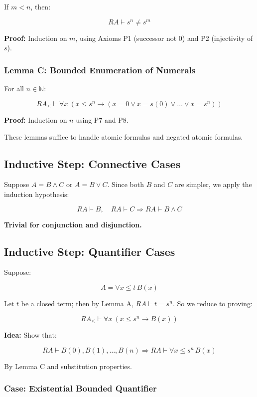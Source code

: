 \documentclass[12pt]{article}
\begin{document}
If \( m < n \), then:

\[
RA \vdash s^n \neq s^m
\]

\textbf{Proof:} Induction on \( m \), using Axioms P1 (successor not 0) and P2 (injectivity of \( s \)).

\subsubsection*{Lemma C: Bounded Enumeration of Numerals}

For all \( n \in \mathbb{N} \):

\[
RA_\leq \vdash \forall x\ (x \leq s^n \rightarrow (x = 0 \vee x = s(0) \vee \dots \vee x = s^n))
\]

\textbf{Proof:} Induction on \( n \) using P7 and P8.

\vspace{0.5em}

These lemmas suffice to handle atomic formulas and negated atomic formulas.

\subsection{Inductive Step: Connective Cases}

Suppose \( A = B \wedge C \) or \( A = B \vee C \). Since both \( B \) and \( C \) are simpler, we apply the induction hypothesis:

\[
RA \vdash B, \quad RA \vdash C \Rightarrow RA \vdash B \wedge C
\]

\textbf{Trivial for conjunction and disjunction.}

\subsection{Inductive Step: Quantifier Cases}

Suppose:

\[
A = \forall x \leq t\, B(x)
\]

Let \( t \) be a closed term; then by Lemma A, \( RA \vdash t = s^n \). So we reduce to proving:

\[
RA_\leq \vdash \forall x\ (x \leq s^n \rightarrow B(x))
\]

\textbf{Idea:} Show that:

\[
RA \vdash B(0), B(1), \dots, B(n)
\Rightarrow RA \vdash \forall x \leq s^n\, B(x)
\]

By Lemma C and substitution properties.

\subsubsection*{Case: Existential Bounded Quantifier}
\end{document}
